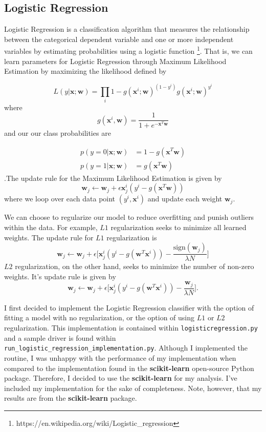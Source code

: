 \documentclass[11pt, oneside]{article}   	%
\begin{document}
\subsection{Logistic Regression}

Logistic Regression is a classification algorithm that measures the relationship between the categorical dependent variable and one or more independent variables by estimating probabilities using a logistic function 
\footnote[2]{https://en.wikipedia.org/wiki/Logistic\_regression}. 
That is, we can learn parameters for Logistic Regression through Maximum Likelihood Estimation by maximizing the likelihood defined by

\[ L(y|\mathbf{x}; \mathbf{w}) = \prod_i{1-g(\mathbf{x}^i;\mathbf{w})^{(1-y^i)}g(\mathbf{x}^i;\mathbf{w})^{y^i}} \]
where
\[ g(\mathbf{x}^i,\mathbf{w}) = \frac{1}{1+e^{-\mathbf{x}^T\mathbf{w}}} \]
and our  our class probabilities are

\begin{align}
    p(y=0|\mathbf{x};\mathbf{w}) &= 1-g(\mathbf{x}^T\mathbf{w}) \\ 
    p(y=1|\mathbf{x};\mathbf{w}) &= g(\mathbf{x}^T\mathbf{w})
\end{align}
.The update rule for the Maximum Likelihood Estimation is given by 
\[ \mathbf{w}_j \leftarrow \mathbf{w}_j + \epsilon \mathbf{x}_j^i(y^i - g(\mathbf{x}^T\mathbf{w})) \]
where we loop over each data point $(y^i, \mathbf{x}^i)$ and update each weight $\mathbf{w}_j$.

We can choose to regularize our model to reduce overfitting and punish outliers within the data. 
For example, $L1$ regularization seeks to minimize all learned weights. The update rule for $L1$ regularization is
\[ \mathbf{w}_j \leftarrow \mathbf{w}_j + \epsilon \bigg[\mathbf{x}_j^i(y^i - g(\mathbf{w}^T\mathbf{x}^i)) 
- \frac{\text{sign}(\mathbf{w}_j)}{\lambda N} \bigg] \]
$L2$ regularization, on the other hand, seeks to minimize the number of non-zero weights. It's update rule is given by
\[ \mathbf{w}_j \leftarrow \mathbf{w}_j + \epsilon \bigg[\mathbf{x}_j^i(y^i - g(\mathbf{w}^T\mathbf{x}^i)) 
- \frac{\mathbf{w}_j}{\lambda N} \bigg]. \]

I first decided to implement the Logistic Regression classifier with the option of fitting a model with no regularization, or the option of using $L1$ or $L2$ regularization. This implementation is contained within \texttt{logisticregression.py} and a sample driver is found within \texttt{run\_logistic\_regression\_implementation.py}. Although I implemented the routine, I was unhappy with the performance of my implementation when compared to the implementation found in the \textbf{scikit-learn} open-source Python package. Therefore, I decided to use the \textbf{scikit-learn} for my analysis. I've included my implementation for the sake of completeness. Note, however, that my results are from the \textbf{scikit-learn} package.
\end{document}
